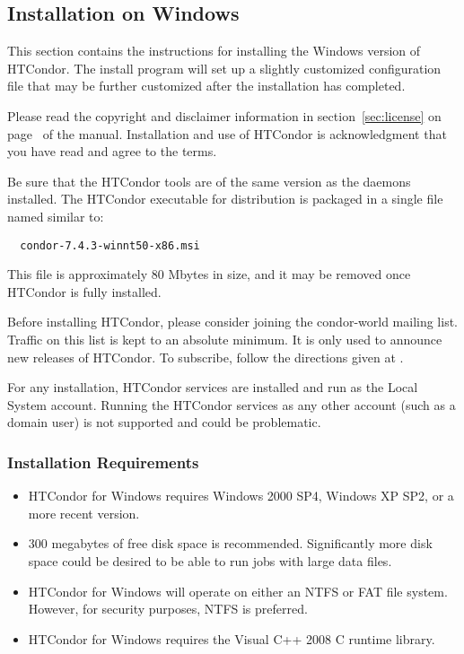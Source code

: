 \subsection{\label{sec:Windows-Install}Installation on Windows}

This section contains the instructions for 
installing the Windows version of HTCondor.  
The install program will set up a slightly customized configuration
file that may be further customized after the installation has completed.

Please read the copyright and disclaimer information in 
section~\ref{sec:license} on
page~\pageref{sec:license} of the manual.
Installation and
use of HTCondor is acknowledgment that you have read and agree to the
terms.

Be sure that the HTCondor tools are of the same version
as the daemons installed.
The HTCondor executable for distribution is packaged in
a single file named similar to:
\begin{verbatim}
  condor-7.4.3-winnt50-x86.msi
\end{verbatim}
This file is approximately 80 Mbytes in size, and it may be
removed once HTCondor is fully installed.

Before installing HTCondor, please consider joining the condor-world mailing
list.  Traffic on this list is kept to an absolute minimum.  It is only
used to announce new releases of HTCondor.
To subscribe, follow the directions given at
.

For any installation, HTCondor services are installed and run as the
Local System account.
Running the HTCondor services as any other account (such as a domain user) 
is not supported and could be problematic.
 
\subsubsection{Installation Requirements}

\begin{itemize}

\item HTCondor for Windows requires Windows 2000 SP4, Windows XP SP2, 
or a more recent version.

\item 300 megabytes of free disk space is recommended.  Significantly more 
disk space could be desired to be able to run jobs with large data files.

\item HTCondor for Windows will operate on either an NTFS or FAT file system.  However, for security purposes, NTFS is preferred.

\item HTCondor for Windows requires the Visual C++ 2008 C runtime library.
\end{itemize}


